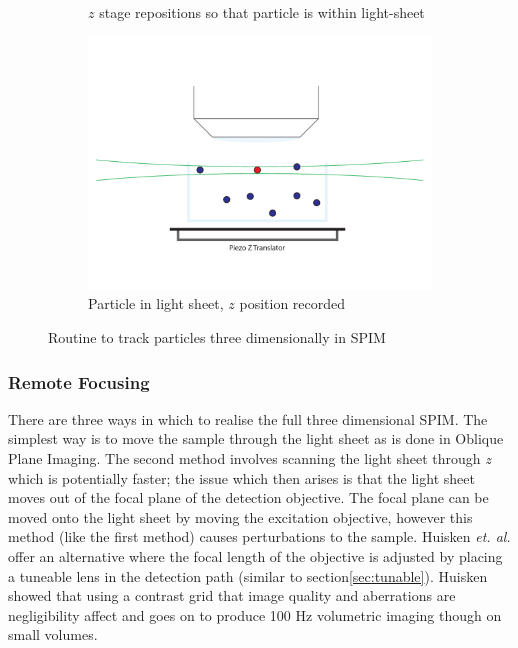 \begin{figure}
\begin{subfigure}[b]{0.35\linewidth}
		\caption{\(z\) stage repositions so that particle is within light-sheet}
		\label{fig:SPIMSPT3}
	\end{subfigure}
	\begin{subfigure}[b]{0.35\linewidth}
		\centering
		\includegraphics[width=0.8\linewidth]{Chapters/spt/Figs/PDF/tracking/4_piezo_track}
		\caption{Particle in light sheet, \(z\) position recorded}
		\label{fig:SPIMSPT4}
	\end{subfigure}
	\caption{Routine to track particles three dimensionally in SPIM}
	\label{fig:SPIMSPT}
\end{figure}

\subsubsection{Remote Focusing}

There are three ways in which to realise the full three dimensional SPIM.
The simplest way is to move the sample through the light sheet as is done in Oblique Plane Imaging.
The second method involves scanning the light sheet through \textit{z} which is potentially faster; the issue which then arises is that the light sheet moves out of the focal plane of the detection objective.
The focal plane can be moved onto the light sheet by moving the excitation objective, however this method (like the first method) causes perturbations to the sample.
Huisken \emph{et. al.} offer an alternative where the focal length of the objective is adjusted by placing a tuneable lens in the detection path (similar to section\ref{sec:tunable})\cite{Fahrbach2013}.
Huisken showed that using a contrast grid that image quality and aberrations are negligibility affect and goes on to produce 100 Hz volumetric imaging though on small volumes\cite{Fahrbach2013}.

